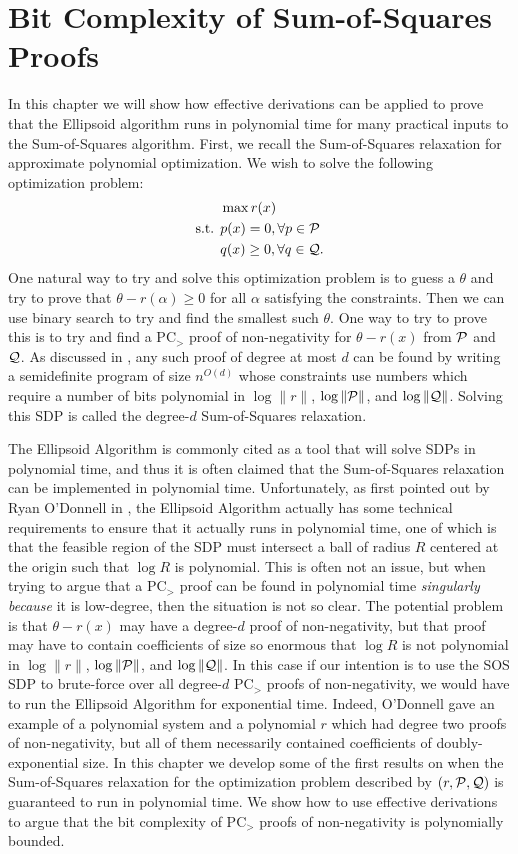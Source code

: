 \chapter{Bit Complexity of Sum-of-Squares Proofs}\label{cha:bit_complexity}
In this chapter we will show how effective derivations can be applied to prove that the Ellipsoid algorithm runs in polynomial time for many practical inputs to the Sum-of-Squares algorithm. First, we recall the Sum-of-Squares relaxation for approximate polynomial optimization. We wish to solve the following optimization problem:
\begin{align*}
&\max r(x)\\
\text{s.t. } &p(x) = 0, \forall p \in \mathcal P \\
&q(x) \geq 0, \forall q \in \mathcal Q.
\end{align*}
One natural way to try and solve this optimization problem is to guess a $\theta$ and try to prove that $\theta - r(\alpha) \geq 0$ for all $\alpha$ satisfying the constraints. Then we can use binary search to try and find the smallest such $\theta$. One way to try to prove this is to try and find a PC$_>$ proof of non-negativity for $\theta - r(x)$ from $\mathcal P$ and $\mathcal Q$. As discussed in , any such proof of degree at most $d$ can be found by writing a semidefinite program of size $n^{O(d)}$ whose constraints use numbers which require a number of bits polynomial in $\log \|r\|$, $\log \|\mathcal P\|$, and $\log \|\mathcal Q\|$. Solving this SDP is called the degree-$d$ Sum-of-Squares relaxation. 

The Ellipsoid Algorithm is commonly cited as a tool that will solve SDPs in polynomial time, and thus it is often claimed that the Sum-of-Squares relaxation can be implemented in polynomial time. Unfortunately, as first pointed out by Ryan O'Donnell in \cite{ODon16}, the Ellipsoid Algorithm actually has some technical requirements to ensure that it actually runs in polynomial time, one of which is that the feasible region of the SDP must intersect a ball of radius $R$ centered at the origin such that $\log R$ is polynomial. This is often not an issue, but when trying to argue that a PC$_>$ proof can be found in polynomial time \emph{singularly because} it is low-degree, then the situation is not so clear. The potential problem is that $\theta - r(x)$ may have a degree-$d$ proof of non-negativity, but that proof may have to contain coefficients of size so enormous that $\log R$ is not polynomial in $\log \|r\|$, $\log \|\mathcal P\|$, and $\log \|\mathcal Q\|$. In this case if our intention is to use the SOS SDP to brute-force over all degree-$d$ PC$_>$ proofs of non-negativity, we would have to run the Ellipsoid Algorithm for exponential time. Indeed, O'Donnell gave an example of a polynomial system and a polynomial $r$ which had degree two proofs of non-negativity, but all of them necessarily contained coefficients of doubly-exponential size. In this chapter we develop some of the first results on when the Sum-of-Squares relaxation for the optimization problem described by $(r, \mathcal P,\mathcal Q)$ is guaranteed to run in polynomial time. We show how to use effective derivations to argue that the bit complexity of PC$_>$ proofs of non-negativity is polynomially bounded. 

